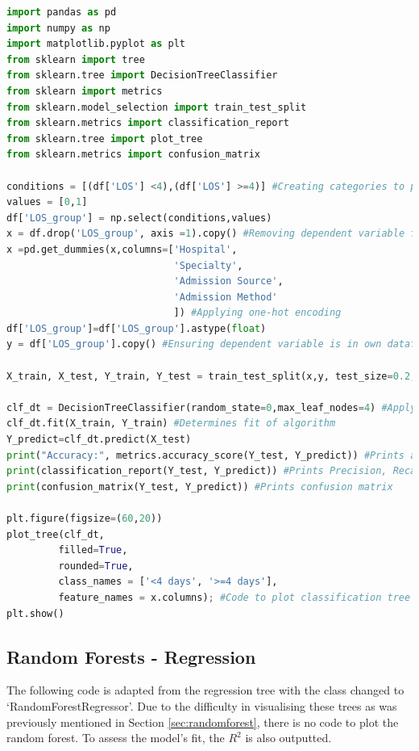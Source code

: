 \documentclass[../thesis.tex]{subfiles}
\begin{document}
\begin{lstlisting}[language = python]
import pandas as pd
import numpy as np
import matplotlib.pyplot as plt
from sklearn import tree
from sklearn.tree import DecisionTreeClassifier
from sklearn import metrics
from sklearn.model_selection import train_test_split
from sklearn.metrics import classification_report
from sklearn.tree import plot_tree
from sklearn.metrics import confusion_matrix

conditions = [(df['LOS'] <4),(df['LOS'] >=4)] #Creating categories to predict
values = [0,1]
df['LOS_group'] = np.select(conditions,values)
x = df.drop('LOS_group', axis =1).copy() #Removing dependent variable from analysis
x =pd.get_dummies(x,columns=['Hospital',
                             'Specialty',
                             'Admission Source',
                             'Admission Method'
                             ]) #Applying one-hot encoding
df['LOS_group']=df['LOS_group'].astype(float)
y = df['LOS_group'].copy() #Ensuring dependent variable is in own dataframe

X_train, X_test, Y_train, Y_test = train_test_split(x,y, test_size=0.2, random_state=0) #Creating training and testing data

clf_dt = DecisionTreeClassifier(random_state=0,max_leaf_nodes=4) #Applying the algorithm
clf_dt.fit(X_train, Y_train) #Determines fit of algorithm
Y_predict=clf_dt.predict(X_test)
print("Accuracy:", metrics.accuracy_score(Y_test, Y_predict)) #Prints accuracy score
print(classification_report(Y_test, Y_predict)) #Prints Precision, Recall and F1 Scores
print(confusion_matrix(Y_test, Y_predict)) #Prints confusion matrix

plt.figure(figsize=(60,20))
plot_tree(clf_dt,
         filled=True,
         rounded=True,
         class_names = ['<4 days', '>=4 days'],
         feature_names = x.columns); #Code to plot classification tree visual
plt.show() 
\end{lstlisting}

\subsection{Random Forests - Regression}
The following code is adapted from the regression tree with the class changed to `RandomForestRegressor'. Due to the difficulty in visualising these trees as was previously mentioned in Section \ref{sec:randomforest}, there is no code to plot the random forest. To assess the model's fit, the $R^{2}$ is also outputted.
\end{document}
